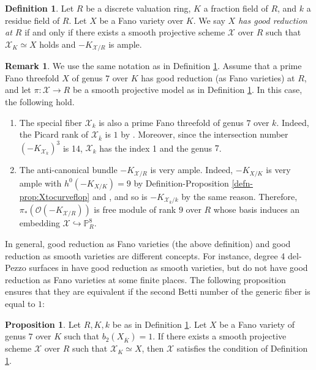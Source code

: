 \documentclass[autodetect-engine, a4paper]{amsart}
\theoremstyle{definition}
\newtheorem{prop}[thm]{Proposition}
\newtheorem{rem}[thm]{Remark}
\newtheorem{defn}[thm]{Definition}
\def\P{{\mathbb P}}
\def\cO{\mathcal{O}}
\begin{document}
\begin{defn}
\label{defn:goodreduction}
Let $R$ be a discrete valuation ring, $K$ a fraction field of $R$, and $k$ a residue field of $R$.  
Let $X$ be a Fano variety over $K$.
We say \emph{$X$ has good reduction at $R$} if and only if there exists a smooth projective scheme $\mathcal{X}$ over $R$ such that $\mathcal{X}_{K} \simeq X$ holds and $-K_{\mathcal{X}/R}$ is ample.
\end{defn}

\begin{rem}
\label{rem:reductionFano}
We use the same notation as in Definition \ref{defn:goodreduction}.
Assume that a prime Fano threefold $X$ of genus $7$ over $K$ has good reduction (as Fano varieties) at $R$, and let $\pi \colon \mathcal{X} \rightarrow R$ be a smooth projective model as in Definition \ref{defn:goodreduction}. In this case, the following hold. 
\begin{enumerate}
\item
The special fiber $\mathcal{X}_{k}$ is also a prime Fano threefold of genus $7$ over $k$. 
Indeed, the Picard rank of $\mathcal{X}_{\overline{k}}$ is $1$ by \cite[Theorem 1.1]{Gounelas-Javanpeykar}.
Moreover, since the intersection number $(-K_{\mathcal{X}_{k}})^3$ is 14, $\mathcal{X}_{k}$ has the index 1 and the genus $7$.
\item 
The anti-canonical bundle $-K_{\mathcal{X}/R}$ is very ample.
Indeed, $-K_{X/K}$ is very ample with $h^0 (-K_{X/K}) =9$ by Definition-Proposition \ref{defn-prop:Xtocurveflop} and \cite[Theorem 1.1 and Theorem 1.2]{Tanaka1}, and so is $-K_{\mathcal{X}_{k}/k}$ by the same reason.
Therefore, $\pi_{*} (\cO(-K_{\mathcal{X}/R}))$ is free module of rank $9$ over $R$ whose basis induces an embedding $\mathcal{X} \hookrightarrow \P^8_{R}$. 
\end{enumerate}
\end{rem}

In general, good reduction as Fano varieties (the above definition) and good reduction as smooth varieties are different concepts.
For instance, degree 4 del-Pezzo surfaces in \cite[Remark 4.6]{Scholl} have good reduction as smooth varieties, but do not have good reduction as Fano varieties at some finite places.
The following proposition ensures that they are equivalent if the second Betti number of the generic fiber is equal to $1$: 

\begin{prop}
Let $R, K, k$ be as in Definition \ref{defn:goodreduction}.
Let $X$ be a Fano variety of genus $7$ over $K$ such that $b_{2} (X_{\overline{K}}) =1$. 
If there exists a smooth projective scheme $\mathcal{X}$ over $R$ such that $\mathcal{X}_{K} \simeq X$, then $\mathcal{X}$ satisfies the condition of Definition \ref{defn:goodreduction}.
\end{prop}
\end{document}
